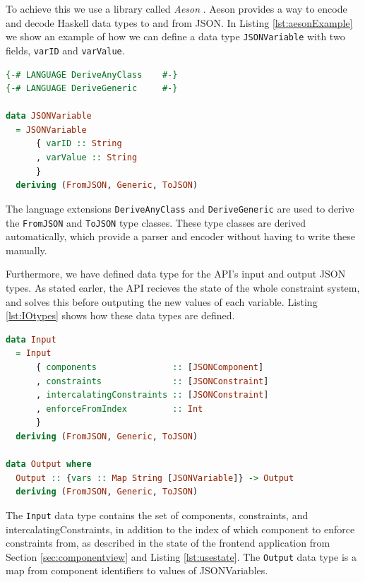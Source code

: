 \documentclass[11pt, a4paper]{article}
\begin{document}
To achieve this we use a library called \textit{Aeson} \cite{aeson}. Aeson provides a way to encode and decode Haskell data types to and from JSON. In Listing \ref{lst:aesonExample} we show an example of how we can define a data type \texttt{JSONVariable} with two fields, \texttt{varID} and \texttt{varValue}.

\begin{lstlisting}[float, language=haskell, caption={Example of a data type for a JSON-variable.}, label={lst:aesonExample}]
{-# LANGUAGE DeriveAnyClass    #-}
{-# LANGUAGE DeriveGeneric     #-}

data JSONVariable
  = JSONVariable
      { varID :: String
      , varValue :: String
      }
  deriving (FromJSON, Generic, ToJSON)
\end{lstlisting}

The language extensions \texttt{DeriveAnyClass} and \texttt{DeriveGeneric} are used to derive the \texttt{FromJSON} and \texttt{ToJSON} type classes. These type classes are derived automatically, which provide a parser and encoder without having to write these manually.

Furthermore, we have defined data type for the API's input and output JSON types. As stated earler, the API recieves the state of the whole constraint system, and solves this before outputing the new values of each variable. Listing \ref{lst:IOtypes} shows how these data types are defined.

\begin{lstlisting}[language=haskell, caption={Input and output data types for the API.}, label={lst:IOtypes}]
data Input
  = Input
      { components               :: [JSONComponent]
      , constraints              :: [JSONConstraint]
      , intercalatingConstraints :: [JSONConstraint]
      , enforceFromIndex         :: Int
      }
  deriving (FromJSON, Generic, ToJSON)

data Output where
  Output :: {vars :: Map String [JSONVariable]} -> Output
  deriving (FromJSON, Generic, ToJSON)
\end{lstlisting}

The \texttt{Input} data type contains the set of components, constraints, and intercalatingConstraints, in addition to the index of which component to enforce constraints from, as described in the state of the frontend application from Section \ref{sec:componentview} and Listing \ref{lst:usestate}. The \texttt{Output} data type is a map from component identifiers to values of JSONVariables.
\end{document}
